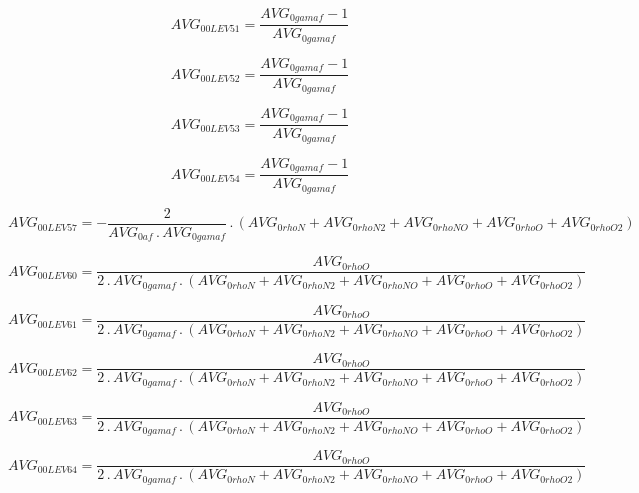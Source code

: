\documentclass{article}
\begin{document}
\begin{dmath}AVG_{0 0 LEV 51} = \frac{AVG_{0 gamaf} - 1}{AVG_{0 gamaf}}\end{dmath}

\begin{dmath}AVG_{0 0 LEV 52} = \frac{AVG_{0 gamaf} - 1}{AVG_{0 gamaf}}\end{dmath}

\begin{dmath}AVG_{0 0 LEV 53} = \frac{AVG_{0 gamaf} - 1}{AVG_{0 gamaf}}\end{dmath}

\begin{dmath}AVG_{0 0 LEV 54} = \frac{AVG_{0 gamaf} - 1}{AVG_{0 gamaf}}\end{dmath}

\begin{dmath}AVG_{0 0 LEV 57} = - \frac{2}{AVG_{0 af} \,.\, AVG_{0 gamaf}} \,.\, \left(AVG_{0 rhoN} + AVG_{0 rhoN2} + AVG_{0 rhoNO} + AVG_{0 rhoO} + AVG_{0 rhoO2}\right)\end{dmath}

\begin{dmath}AVG_{0 0 LEV 60} = \frac{AVG_{0 rhoO}}{2 \,.\, AVG_{0 gamaf} \,.\, \left(AVG_{0 rhoN} + AVG_{0 rhoN2} + AVG_{0 rhoNO} + AVG_{0 rhoO} + AVG_{0 rhoO2}\right)}\end{dmath}

\begin{dmath}AVG_{0 0 LEV 61} = \frac{AVG_{0 rhoO}}{2 \,.\, AVG_{0 gamaf} \,.\, \left(AVG_{0 rhoN} + AVG_{0 rhoN2} + AVG_{0 rhoNO} + AVG_{0 rhoO} + AVG_{0 rhoO2}\right)}\end{dmath}

\begin{dmath}AVG_{0 0 LEV 62} = \frac{AVG_{0 rhoO}}{2 \,.\, AVG_{0 gamaf} \,.\, \left(AVG_{0 rhoN} + AVG_{0 rhoN2} + AVG_{0 rhoNO} + AVG_{0 rhoO} + AVG_{0 rhoO2}\right)}\end{dmath}

\begin{dmath}AVG_{0 0 LEV 63} = \frac{AVG_{0 rhoO}}{2 \,.\, AVG_{0 gamaf} \,.\, \left(AVG_{0 rhoN} + AVG_{0 rhoN2} + AVG_{0 rhoNO} + AVG_{0 rhoO} + AVG_{0 rhoO2}\right)}\end{dmath}

\begin{dmath}AVG_{0 0 LEV 64} = \frac{AVG_{0 rhoO}}{2 \,.\, AVG_{0 gamaf} \,.\, \left(AVG_{0 rhoN} + AVG_{0 rhoN2} + AVG_{0 rhoNO} + AVG_{0 rhoO} + AVG_{0 rhoO2}\right)}\end{dmath}
\end{document}
